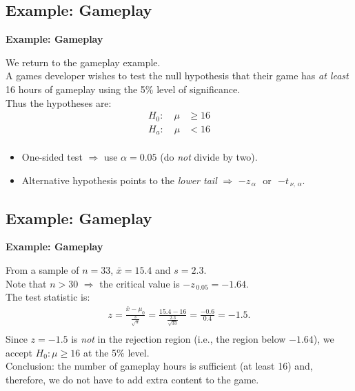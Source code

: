 \documentclass[compress]{beamer}        %
\makeatletter
\newcommand{\tcb}{\textcolor{beamer@blendedblue}}
\makeatother
\begin{document}
\subsection{Example: Gameplay}
\begin{frame}{\bf \tcb{Example: Gameplay}}

We return to the gameplay example.\\[0.4cm]

A games developer wishes to test the null hypothesis that their game has \emph{at least} 16 hours of gameplay using the 5\% level of significance.\\[0.4cm]

Thus the hypotheses are:
\begin{align*}
H_0: \quad \mu &\ge 16\\[0.2cm]
H_a: \quad \mu &< 16\\[-1cm]
\end{align*}
\begin{itemize}\itemsep0.4cm
\item One-sided test $\Rightarrow$ use $\alpha = 0.05$ (do \emph{not} divide by two).
\item Alternative hypothesis points to the \emph{lower tail} $\Rightarrow$ $- z_{\,\alpha}$\,\, or \,\,$- t_{\,\nu,\,\alpha}$.
\end{itemize}

\end{frame}



\subsection{Example: Gameplay}
\begin{frame}{\bf \tcb{Example: Gameplay}}

From a sample of $n= 33$, $\bar x = 15.4$ and $s = 2.3$.\\[0.4cm]

Note that $n >30$ $\Rightarrow$ the critical value is $- z_{\,0.05} = -1.64$.\\[0.4cm]

The test statistic is:\\[-0.2cm]
\begin{align*}
z =  \frac{\bar x - \mu_0}{\frac{s}{\sqrt{n}}} = \frac{15.4 - 16}{\frac{2.3}{\sqrt{33}}} = \frac{-0.6}{0.4} = -1.5.\\[-0.3cm]
\end{align*}
Since $z=-1.5$ is \emph{not} in the rejection region (i.e., the region below $-1.64$), we accept $H_0: \mu \ge 16$ at the 5\% level.\\[0.6cm]

Conclusion: the number of gameplay hours is sufficient (at least 16) and, therefore, we do not have to add extra content to the game.

\end{frame}
\end{document}
